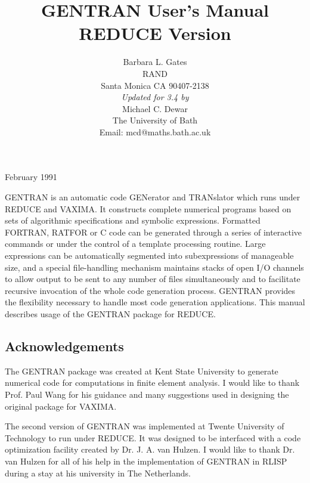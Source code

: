 \title{GENTRAN User's Manual \\ REDUCE Version}
\date{}
\author{Barbara L. Gates \\ RAND \\
Santa Monica CA 90407-2138 \\[0.05in]
{\em Updated for {\REDUCE} 3.4 by} \\[0.05in]
Michael C. Dewar \\
The University of Bath \\
Email: mcd@maths.bath.ac.uk}

\maketitle

 

\begin{center} February 1991 \end{center}

GENTRAN is an automatic code GENerator and TRANslator which runs under
REDUCE and VAXIMA.  It constructs complete numerical
programs based on sets of algorithmic specifications and symbolic
expressions.  Formatted FORTRAN, RATFOR or C code can be generated
through a series of interactive commands or under the control of a
template processing routine.  Large expressions can be automatically
segmented into subexpressions of manageable size, and a special
file-handling mechanism maintains stacks of open I/O channels to allow
output to be sent to any number of files simultaneously and to
facilitate recursive invocation of the whole code generation process.
GENTRAN provides the flexibility necessary to handle most code
generation applications.  This manual describes usage of the GENTRAN
package for REDUCE.

\subsection*{Acknowledgements}

The GENTRAN package was created at Kent State University to generate
numerical code for computations in finite element analysis.  I would
like to thank Prof. Paul Wang for his guidance and many suggestions
used in designing the original package for VAXIMA.

The second version of GENTRAN was implemented at Twente University of
Technology to run under REDUCE.  It was designed to be interfaced with
a code optimization facility created by Dr. J. A. van Hulzen.  I would
like to thank Dr. van Hulzen for all of his help in the implementation
of GENTRAN in RLISP during a stay at his university in The
Netherlands.

